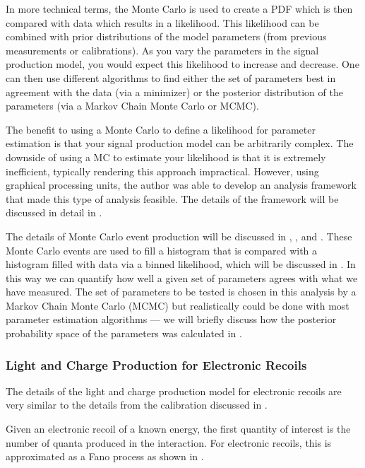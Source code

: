 In more technical terms, the Monte Carlo is used to create a PDF which is then compared with data which results in a likelihood.  This likelihood can be combined with prior distributions of the model parameters (from previous measurements or calibrations).  As you vary the parameters in the signal production model, you would expect this likelihood to increase and decrease.  One can then use different algorithms to find either the set of parameters best in agreement with the data (via a minimizer) or the posterior distribution of the parameters (via a Markov Chain Monte Carlo or MCMC).

The benefit to using a Monte Carlo to define a likelihood for parameter estimation is that your signal production model can be arbitrarily complex.  The downside of using a MC to estimate your likelihood is that it is extremely inefficient, typically rendering this approach impractical.  However, using graphical processing units, the author was able to develop an analysis framework that made this type of analysis feasible.  The details of the framework will be discussed in detail in .

The details of Monte Carlo event production will be discussed in , , and .  These Monte Carlo events are used to fill a histogram that is compared with a histogram filled with data via a binned likelihood, which will be discussed in .  In this way we can quantify how well a given set of parameters agrees with what we have measured.  The set of parameters to be tested is chosen in this analysis by a Markov Chain Monte Carlo (MCMC) but realistically could be done with most parameter estimation algorithms --- we will briefly discuss how the posterior probability space of the parameters was calculated in .
 

\subsubsection{Light and Charge Production for Electronic Recoils}
\label{sec:xe1t_mc_observables_production_er}

The details of the light and charge production model for electronic recoils are very similar to the details from the calibration discussed in .  

Given an electronic recoil of a known energy, the first quantity of interest is the number of quanta produced in the interaction.  For electronic recoils, this is approximated as a Fano process as shown in .


